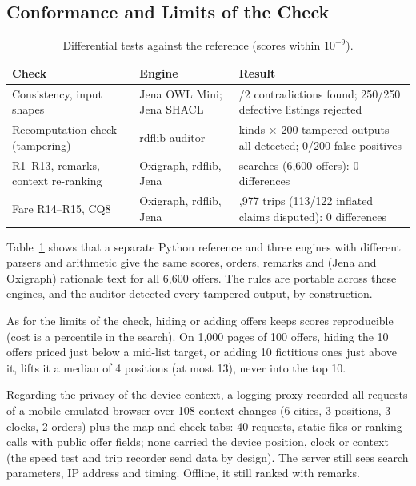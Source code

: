 \documentclass{svproc}
\begin{document}
\subsection{Conformance and Limits of the Check}\label{sec:verif}
\begin{table}[t]
  \caption{Differential tests against the reference (scores within $10^{-9}$).}
  \label{tab:verif}
  \centering\scriptsize
  \begin{tabular}{@{}>{\raggedright}p{2.9cm}>{\raggedright}p{2.3cm}>{\raggedright\arraybackslash}p{6.5cm}@{}}
    \toprule
    Check & Engine & Result \\
    \midrule
    Consistency, input shapes & Jena OWL Mini; Jena SHACL & 2/2 contradictions found; 250/250 defective listings rejected \\
    Recomputation check (tampering) & rdflib auditor & 6 kinds $\times$ 200 tampered outputs all detected; 0/200 false positives \\
    R1--R13, remarks, context re-ranking & Oxigraph, rdflib, Jena & 90 searches (6,600 offers): 0 differences \\
    Fare R14--R15, CQ8 & Oxigraph, rdflib, Jena & 1,977 trips (113/122 inflated claims disputed): 0 differences \\
    \bottomrule
  \end{tabular}
\end{table}

Table~\ref{tab:verif} shows that a separate Python reference and three engines with different parsers and arithmetic give the same scores, orders, remarks and (Jena and Oxigraph) rationale text for all 6,600 offers. The rules are portable across these engines, and the auditor detected every tampered output, by construction.

As for the limits of the check, hiding or adding offers keeps scores reproducible (cost is a percentile in the search). On 1,000 pages of 100 offers, hiding the 10 offers priced just below a mid-list target, or adding 10 fictitious ones just above it, lifts it a median of 4 positions (at most 13), never into the top 10.

Regarding the privacy of the device context, a logging proxy recorded all requests of a mobile-emulated browser over 108 context changes (6 cities, 3 positions, 3 clocks, 2 orders) plus the map and check tabs: 40 requests, static files or ranking calls with public offer fields; none carried the device position, clock or context (the speed test and trip recorder send data by design). The server still sees search parameters, IP address and timing. Offline, it still ranked with remarks.
\end{document}
